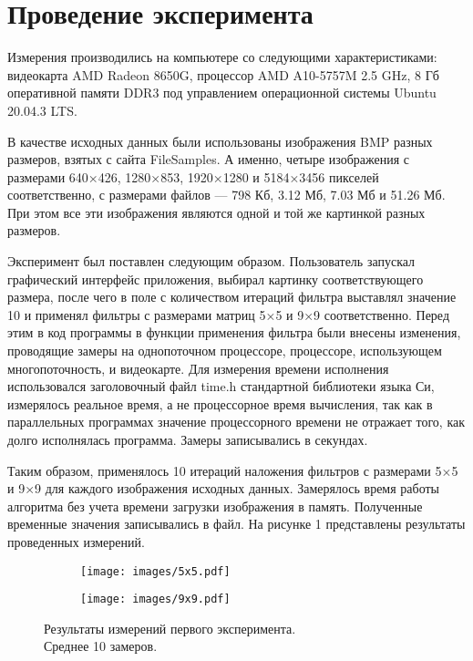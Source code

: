 \section{Проведение эксперимента}

Измерения производились на компьютере со следующими характеристиками: видеокарта AMD Radeon 8650G, процессор AMD A10-5757M 2.5 GHz, 
8 Гб оперативной памяти DDR3 под управлением операционной системы Ubuntu 20.04.3 LTS.

В качестве исходных данных были использованы изображения BMP разных размеров, взятых с сайта FileSamples\cite{filesamlpes}. 
А именно, четыре изображения с размерами 640×426, 1280×853, 1920×1280 и 5184×3456 пикселей соответственно, с размерами файлов --- 
798 Кб, 3.12 Мб, 7.03 Мб и 51.26 Мб. При этом все эти изображения являются одной и той же картинкой разных размеров.

Эксперимент был поставлен следующим образом. Пользователь запускал графический интерфейс приложения, выбирал картинку соответствующего 
размера, после чего в поле с количеством итераций фильтра выставлял значение 10 и применял фильтры с размерами матриц 5×5 и 9×9 соответственно. 
Перед этим в код программы в функции применения фильтра были внесены изменения, проводящие замеры на однопоточном процессоре, процессоре, 
использующем многопоточность, и видеокарте. Для измерения времени исполнения использовался заголовочный файл time.h стандартной библиотеки 
языка Си, измерялось реальное время, а не процессорное время вычисления, так как в параллельных программах значение процессорного времени 
не отражает того, как долго исполнялась программа. Замеры записывались в секундах.

Таким образом, применялось 10 итераций наложения фильтров с размерами 5×5 и 9×9 для каждого изображения исходных данных. 
Замерялось время работы алгоритма без учета времени загрузки изображения в память. Полученные временные значения записывались в файл. 
На рисунке 1 представлены результаты проведенных измерений.

\begin{figure}[htp]
\centering
    \begin{subfigure}{0.5\textwidth}
        \texttt{[image: images/5x5.pdf]}
    \end{subfigure}\hfill
    \begin{subfigure}{0.5\textwidth}
        \texttt{[image: images/9x9.pdf]}
    \end{subfigure}\hfill
\caption{Результаты измерений первого эксперимента.\\ Среднее 10 замеров.}
\end{figure}

